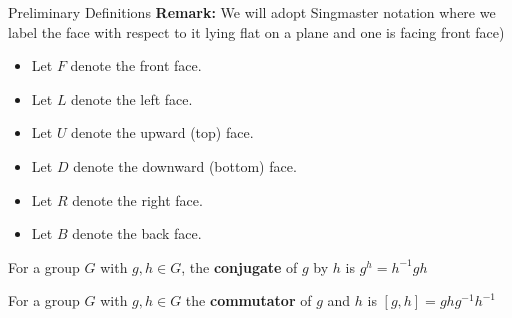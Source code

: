 \documentclass[final]{beamer}
\newlength{\colwidth}
\begin{document}
\begin{frame}[t]
\begin{columns}[t]
\begin{column}{\colwidth}
\begin{alertblock}{Preliminary Definitions}
\textbf{Remark:} 
We will adopt Singmaster notation where  
we label the face with respect to it lying
flat on a plane and one is facing front face)

\begin{itemize}
\item Let $F$ denote the front face.
\item Let $L$ denote the left face.
\item Let $U$ denote the upward (top) face.
\item Let $D$ denote the downward (bottom) face.
\item Let $R$ denote the right face.
\item Let $B$ denote the back face.
\end{itemize}

For a group $G$ with $g,h \in G$, the \textbf{conjugate} of $g$ by $h$ is
$g^h = h^{-1}gh$ 

For a group $G$ with $g,h \in G$ 
the \textbf{commutator} of $g$ and $h$ is 
$[g,h]=ghg^{-1}h^{-1}$







\end{alertblock}
\end{column}
\end{columns}
\end{frame}
\end{document}
